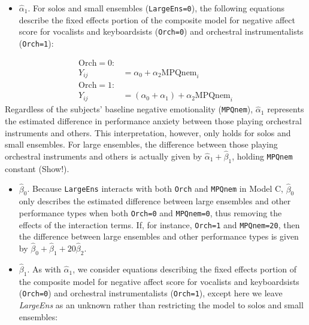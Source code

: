 \documentclass[
]{krantz}
\providecommand{\tightlist}{%
  \setlength{\itemsep}{0pt}\setlength{\parskip}{0pt}}
\begin{document}
\begin{itemize}
\tightlist
\item
  \(\hat{\alpha}_{1}\). For solos and small ensembles (\texttt{LargeEns=0}), the following equations describe the fixed effects portion of the composite model for negative affect score for vocalists and keyboardsists (\texttt{Orch=0}) and orchestral instrumentalists (\texttt{Orch=1}):
\end{itemize}

\begin{align*}
\textrm{Orch}=0: & \\
Y_{ij} & = \alpha_{0}+\alpha_{2}\textrm{MPQnem}_{i} \\
\textrm{Orch}=1: & \\
Y_{ij} & = (\alpha_{0}+\alpha_{1})+\alpha_{2}\textrm{MPQnem}_{i}
\end{align*}
Regardless of the subjects' baseline negative emotionality (\texttt{MPQnem}), \(\hat{\alpha}_{1}\) represents the estimated difference in performance anxiety between those playing orchestral instruments and others. This interpretation, however, only holds for solos and small ensembles. For large ensembles, the difference between those playing orchestral instruments and others is actually given by \(\hat{\alpha}_{1}+\hat{\beta}_{1}\), holding \texttt{MPQnem} constant (Show!).

\begin{itemize}
\tightlist
\item
  \(\hat{\beta}_{0}\). Because \texttt{LargeEns} interacts with both \texttt{Orch} and \texttt{MPQnem} in Model C, \(\hat{\beta}_{0}\) only describes the estimated difference between large ensembles and other performance types when both \texttt{Orch=0} and \texttt{MPQnem=0}, thus removing the effects of the interaction terms. If, for instance, \texttt{Orch=1} and \texttt{MPQnem=20}, then the difference between large ensembles and other performance types is given by \(\hat{\beta}_{0}+\hat{\beta}_{1}+20\hat{\beta}_{2}\).
\item
  \(\hat{\beta}_{1}\). As with \(\hat{\alpha}_{1}\), we consider equations describing the fixed effects portion of the composite model for negative affect score for vocalists and keyboardsists (\texttt{Orch=0}) and orchestral instrumentalists (\texttt{Orch=1}), except here we leave \emph{LargeEns} as an unknown rather than restricting the model to solos and small ensembles:
\end{itemize}
\end{document}
